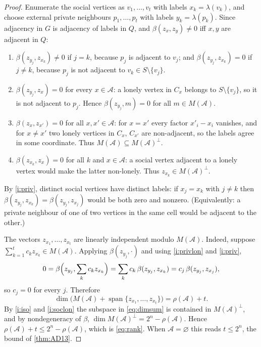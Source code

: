 \documentclass[11pt,a4paper]{article}
\theoremstyle{plain}
\theoremstyle{definition}
\theoremstyle{remark}
\newcommand{\cA}{\mathcal A}
\newcommand{\rk}{\rho}
\newcommand{\spn}{\operatorname{span}}
\newcommand{\lab}{\lambda}
\begin{document}
\label{pf:rank}
\lemrank*
\begin{proof}
Enumerate the social vertices as $v_1,\dots,v_t$ with labels $x_k=\lab(v_k)$, and choose external private neighbours $p_1,\dots,p_t$ with labels $y_k=\lab(p_k)$. Since adjacency in $G$ is adjacency of labels in $Q$, and $\beta(z_x,z_y)\ne0$ iff $x,y$ are adjacent in $Q$:
\begin{enumerate}[label=(\roman*),itemsep=1pt]
\item\label{i:priv} $\beta(z_{y_j},z_{x_k})\ne0$ if $j=k$, because $p_j$ is adjacent to $v_j$; and $\beta(z_{y_j},z_{x_k})=0$ if $j\ne k$, because $p_j$ is not adjacent to $v_k\in S\setminus\{v_j\}$.
\item\label{i:privlon} $\beta(z_{y_j},z_x)=0$ for every $x\in\cA$: a lonely vertex in $C_x$ belongs to $S\setminus\{v_j\}$, so it is not adjacent to $p_j$. Hence $\beta(z_{y_j},m)=0$ for all $m\in M(\cA)$.
\item\label{i:iso} $\beta(z_x,z_{x'})=0$ for all $x,x'\in\cA$: for $x=x'$ every factor $x'_i-x_i$ vanishes, and for $x\ne x'$ two lonely vertices in $C_x$, $C_{x'}$ are non-adjacent, so the labels agree in some coordinate. Thus $M(\cA)\subseteq M(\cA)^\perp$.
\item\label{i:soclon} $\beta(z_{x_k},z_x)=0$ for all $k$ and $x\in\cA$: a social vertex adjacent to a lonely vertex would make the latter non-lonely. Thus $z_{x_k}\in M(\cA)^\perp$.
\end{enumerate}
By \ref{i:priv}, distinct social vertices have distinct labels: if $x_j=x_k$ with $j\ne k$ then $\beta(z_{y_j},z_{x_k})=\beta(z_{y_j},z_{x_j})$ would be both zero and nonzero. (Equivalently: a private neighbour of one of two vertices in the same cell would be adjacent to the other.)

The vectors $z_{x_1},\dots,z_{x_t}$ are linearly independent modulo $M(\cA)$. Indeed, suppose $\sum_{k=1}^tc_kz_{x_k}\in M(\cA)$. Applying $\beta(z_{y_j},\cdot)$ and using \ref{i:privlon} and \ref{i:priv},
\[
0=\beta\Bigl(z_{y_j},\sum_kc_kz_{x_k}\Bigr)=\sum_kc_k\,\beta(z_{y_j},z_{x_k})=c_j\,\beta(z_{y_j},z_{x_j}),
\]
so $c_j=0$ for every $j$. Therefore
\begin{equation}\label{eq:dimsum}
\dim\bigl(M(\cA)+\spn\{z_{x_1},\dots,z_{x_t}\}\bigr)=\rk(\cA)+t.
\end{equation}
By \ref{i:iso} and \ref{i:soclon} the subspace in \eqref{eq:dimsum} is contained in $M(\cA)^\perp$, and by nondegeneracy of $\beta$, $\dim M(\cA)^\perp=2^n-\rk(\cA)$. Hence $\rk(\cA)+t\le2^n-\rk(\cA)$, which is \eqref{eq:rank}. When $\cA=\varnothing$ this reads $t\le2^n$, the bound of \cref{thm:AD13}.
\end{proof}
\end{document}
